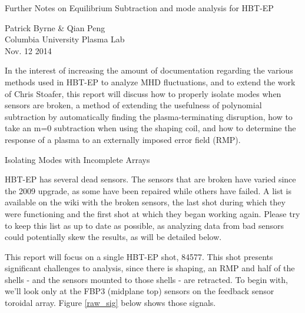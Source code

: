 \documentclass{article}
\begin{document}
\begin{center}
\begin{LARGE}
Further Notes on Equilibrium Subtraction and mode analysis for HBT-EP\\
\end{LARGE}
\begin{large}
\vspace{0.25 in}
Patrick Byrne \& Qian Peng\\
Columbia University Plasma Lab\\
Nov. 12 2014\\
\end{large}
\end{center}
\vspace{0.25 in}

\par
In the interest of increasing the amount of documentation regarding the various methods used in HBT-EP to analyze MHD fluctuations, and to extend the work of Chris Stoafer, this report will discuss how to properly isolate modes when sensors are broken, a method of extending the usefulness of polynomial subtraction by automatically finding the plasma-terminating disruption, how to take an m=0 subtraction when using the shaping coil, and how to determine the response of a plasma to an externally imposed error field (RMP).
\vspace{0.25in}
\begin{center}
\begin{LARGE}
Isolating Modes with Incomplete Arrays
\end{LARGE}
\end{center}
\par
HBT-EP has several dead sensors.  The sensors that are broken have varied since the 2009 upgrade, as some have been repaired while others have failed.  A list is available on the wiki with the broken sensors, the last shot during which they were functioning and the first shot at which they began working again.  Please try to keep this list as up to date as possible, as analyzing data from bad sensors could potentially skew the results, as will be detailed below.
\par
This report will focus on a single HBT-EP shot, 84577. This shot presents significant challenges to analysis, since there is shaping, an RMP and half of the shells - and the sensors mounted to those shells - are retracted.  To begin with, we'll look only at the FBP3 (midplane top) sensors on the feedback sensor toroidal array.  Figure \ref{raw_sig} below shows those signals.
\end{document}

